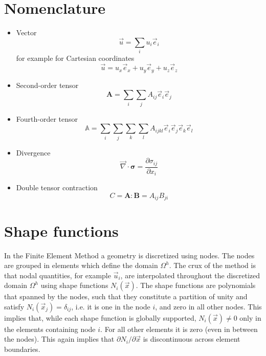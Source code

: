 \documentclass[times,namecite]{goose-article}
\begin{document}
\appendix

\section{Nomenclature}

\begin{itemize}
  \item Vector
  \begin{equation}
    \vec{u} = \sum\limits_i u_i \vec{e}_i
  \end{equation}
  for example for Cartesian coordinates
  \begin{equation}
    \vec{u} = u_x \vec{e}_x + u_y \vec{e}_y + u_z \vec{e}_z
  \end{equation}
  \item Second-order tensor
  \begin{equation}
    \bm{A} = \sum\limits_i \sum\limits_j A_{ij} \vec{e}_i \vec{e}_j
  \end{equation}
  \item Fourth-order tensor
  \begin{equation}
    \mathbb{A} = \sum\limits_i \sum\limits_j \sum\limits_k \sum\limits_l A_{ijkl} \vec{e}_i \vec{e}_j \vec{e}_k \vec{e}_l
  \end{equation}
  \item Divergence
  \begin{equation}
    \vec{\nabla} \cdot \bm{\sigma} = \frac{ \partial \sigma_{ij} }{ \partial x_i }
  \end{equation}
  \item Double tensor contraction
  \begin{equation}
    C = \bm{A} : \bm{B} = A_{ij} B_{ji}
  \end{equation}
\end{itemize}

\section{Shape functions}

In the Finite Element Method a geometry is discretized using nodes. The nodes are grouped in elements which define the domain $\Omega^h$. The crux of the method is that nodal quantities, for example $\vec{u}_i$, are interpolated throughout the discretized domain $\Omega^h$ using shape functions $N_i (\vec{x})$. The shape functions are polynomials that spanned by the nodes, such that they constitute a partition of unity and satisfy $N_i (\vec{x}_j) = \delta_{ij}$, i.e. it is one in the node $i$, and zero in all other nodes. This implies that, while each shape function is globally supported, $N_i (\vec{x}) \neq 0$ only in the elements containing node $i$. For all other elements it is zero (even in between the nodes). This again implies that $\partial N_i / \partial \vec{x}$ is discontinuous across element boundaries.
\end{document}
